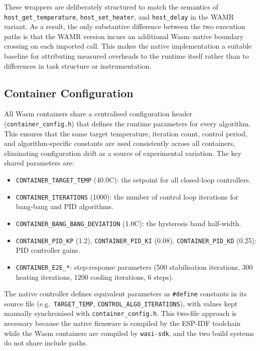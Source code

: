 \documentclass[12pt, a4paper]{report}
\begin{document}
These wrappers are deliberately structured to match the semantics of
\texttt{host\_get\_temperature}, \texttt{host\_set\_heater}, and \texttt{host\_delay} in the WAMR
variant. As a result, the only substantive difference between the two execution paths is that the
WAMR version incurs an additional Wasm--native boundary crossing on each imported call. This makes
the native implementation a suitable baseline for attributing measured overheads to the runtime
itself rather than to differences in task structure or instrumentation.

\subsection{Container Configuration}
\label{subsec:container-config}

All Wasm containers share a centralised configuration header (\texttt{container\_config.h}) that defines the runtime parameters for every algorithm. This ensures that the same target temperature, iteration count, control period, and algorithm-specific constants are used consistently across all containers, eliminating configuration drift as a source of experimental variation. The key shared parameters are:

\begin{itemize}
    \item \texttt{CONTAINER\_TARGET\_TEMP} (40.0\textdegree C): the setpoint for all closed-loop controllers.
    \item \texttt{CONTAINER\_ITERATIONS} (1000): the number of control loop iterations for bang-bang and PID algorithms.
    \item \texttt{CONTAINER\_BANG\_BANG\_DEVIATION} (1.0\textdegree C): the hysteresis band half-width.
    \item \texttt{CONTAINER\_PID\_KP} (1.2), \texttt{CONTAINER\_PID\_KI} (0.08), \texttt{CONTAINER\_PID\_KD} (0.25): PID controller gains.
    \item \texttt{CONTAINER\_E2E\_*}: step-response parameters (500 stabilisation iterations, 300 heating iterations, 1200 cooling iterations, 6 steps).
\end{itemize}

The native controller defines equivalent parameters as \texttt{\#define} constants in its source file (e.g.\ \texttt{TARGET\_TEMP}, \texttt{CONTROL\_ALGO\_ITERATIONS}), with values kept manually synchronised with \texttt{container\_config.h}. This two-file approach is necessary because the native firmware is compiled by the ESP-IDF toolchain while the Wasm containers are compiled by \texttt{wasi-sdk}, and the two build systems do not share include paths.
\end{document}
